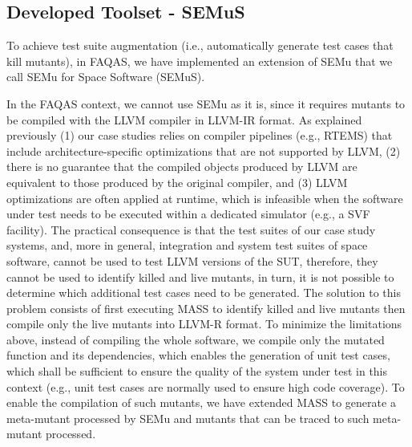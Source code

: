 
\newpage
\subsection{Developed Toolset - SEMuS}
\label{sec:semus}

\STARTCHANGEDWPT


To achieve test suite augmentation (i.e., automatically generate test cases that kill mutants), in FAQAS, we have implemented an extension of SEMu that we call SEMu for Space Software (SEMuS).



In the FAQAS context, we cannot use SEMu as it is, since it requires mutants to be compiled with the LLVM compiler in LLVM-IR format. As explained previously (1) our case studies relies on compiler pipelines (e.g., RTEMS) that include architecture-specific optimizations that are not supported by LLVM, (2) there is no guarantee that the compiled objects produced by LLVM are equivalent to those produced by the original compiler, and (3) LLVM optimizations are often applied at runtime, which is infeasible when the software under test needs to be executed within a dedicated simulator (e.g., a SVF facility). The practical consequence is that the test suites of our case study systems, and, more in general, integration and system test suites of space software, cannot be used to test LLVM versions of the SUT, therefore, they cannot be used to identify killed and live mutants, in turn, it is not possible to determine which additional test cases need to be generated. The solution to this problem consists of first executing MASS to identify killed and live mutants then compile only the live mutants into LLVM-R format. To minimize the limitations above, instead of compiling the whole software, we compile only the mutated function and its dependencies, which enables the generation of unit test cases, which shall be sufficient to ensure the quality of the system under test in this context (e.g., unit test cases are normally used to ensure high code coverage). To enable the compilation of such mutants, we have extended MASS to generate a meta-mutant processed by SEMu and mutants that can be traced to such meta-mutant processed.

